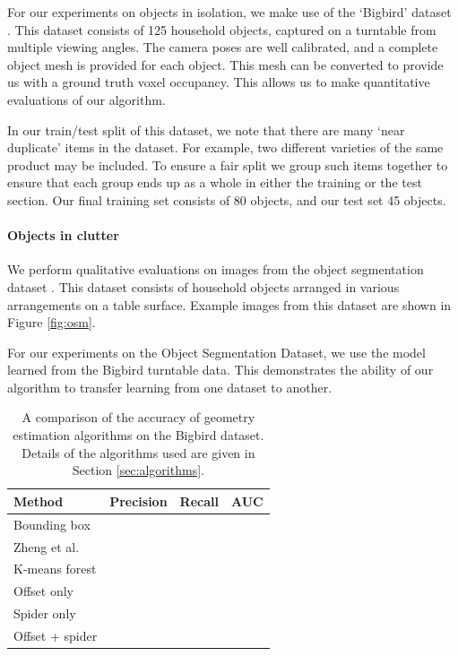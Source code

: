 \documentclass[10pt,twocolumn,letterpaper]{article}
\makeatletter
\newcommand*{\ea}{et al.\@\xspace}
\makeatother
\begin{document}
For our experiments on objects in isolation, we make use of the `Bigbird' dataset \cite{singh-icra-2014}. 
This dataset consists of 125 household objects, captured on a turntable from multiple viewing angles.
The camera poses are well calibrated, and a complete object mesh is provided for each object.
This mesh can be converted to provide us with a ground truth voxel occupancy.
This allows us to make quantitative evaluations of our algorithm.

In our train/test split of this dataset, we note that there are many `near duplicate' items in the dataset.
For example, two different varieties of the same product may be included.
To ensure a fair split we group such items together to ensure that each group ends up as a whole in either the training or the test section.
Our final training set consists of 80 objects, and our test set 45 objects.

\paragraph{Objects in clutter}

We perform qualitative evaluations on images from the object segmentation dataset \cite{richtsfeld-iros-2012}.
This dataset consists of household objects arranged in various arrangements on a table surface.
Example images from this dataset are shown in Figure \ref{fig:osm}.

For our experiments on the Object Segmentation Dataset, we use the model learned from the Bigbird turntable data.
This demonstrates the ability of our algorithm to transfer learning from one dataset to another.



\begin{table}
  \centering
  \begin{tabular}{p{2.6cm}lll}
  \toprule
  \textbf{Method}  &   \textbf{Precision} & \textbf{Recall} & \textbf{AUC} \\
  \midrule
  Bounding box &  &  &  \\
  Zheng \ea \cite{zheng-cvpr-2013} &  &  &  \\
  K-means forest &  &  &  \\
  Offset only &  &  &  \\
  Spider only &  &  &  \\
  Offset + spider &  &  &  \\
  \bottomrule
  \end{tabular}
  \vspace{5pt}
  \caption{A comparison of the accuracy of geometry estimation algorithms on the Bigbird dataset. Details of the algorithms used are given in Section \ref{sec:algorithms}.}
    \label{tab:features_used}
\end{table}
\end{document}

